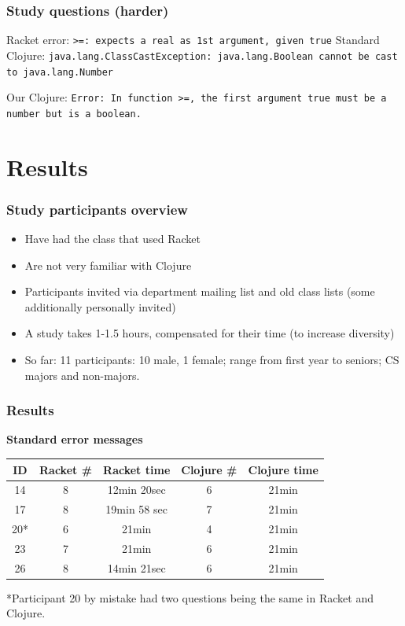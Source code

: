 \documentclass{beamer}
\newcommand{\comment}[1]{{\bf \tt  {#1}}}
\newcommand{\emcomment}[1]{\textcolor{ForestGreen}{\comment{Elena: {#1}}}}
\begin{document}
\begin{frame}[fragile]
\frametitle{Study questions (harder)}
Racket error: {\tt >=: expects a real as 1st argument, given true}
\vspace*{.2in}
Standard Clojure: {\tt java.lang.ClassCastException: java.lang.Boolean cannot be cast to java.lang.Number}

\vspace*{.2in}

Our Clojure: {\tt Error: In function >=, the first argument true must be a number but is a boolean.}
\end{frame}

\section{Results}

\begin{frame}
\frametitle{Study participants overview}
\begin{itemize}
\item Have had the class that used Racket
\item Are not very familiar with Clojure 
\item Participants invited via department mailing list and old class lists (some additionally personally invited)
\item A study takes 1-1.5 hours, compensated for their time (to increase diversity)
\item So far: 11 participants: 10 male, 1 female; range from first year to seniors; CS majors and non-majors.  
\end{itemize}
\end{frame}

\begin{frame}
\frametitle{Results}
{\bf Standard error messages} 
\vspace{0.1in}

\begin{tabular}{c | c| c| c | c }
\hline
{\bf ID} & {\bf Racket  \#} & {\bf Racket time} & {\bf Clojure  \#} & {\bf Clojure time} \\
\hline 
14 &  8 & 12min 20sec &  6  &  21min \\
17 &  8 & 19min 58 sec &  7 &  21min \\
20* &  6 & 21min &  4 &  21min \\
23 &  7 & 21min &  6  &  21min \\
26 &  8 & 14min 21sec &  6 &  21min \\
\hline
\end{tabular}

*Participant 20 by mistake had two questions being the same in Racket and Clojure. 
\end{frame}
\end{document}
